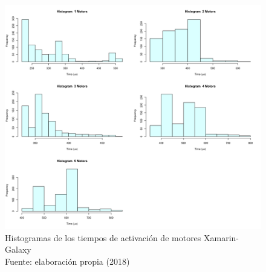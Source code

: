 \begin{figure}
 \begin{center} 
   	\includegraphics[width=1.0\textwidth]{evaluation/graphics/Xamarin/Galaxy/HistMotorsXamarinGalaxy.png} 
   	\captionsetup{justification=centering}
    \caption[Histogramas de los tiempos de activación de motores Xamarin-Galaxy]{Histogramas de los tiempos de activación de motores  Xamarin-Galaxy\\Fuente: elaboración propia (2018)} 
    \label{fig:xamarin-galaxy-hist-motors}
  \end{center}
\end{figure}

